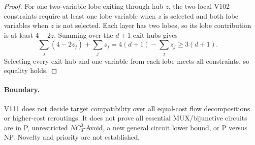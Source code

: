 \documentclass[11pt]{article}
\begin{document}
\begin{proof}
For one two-variable lobe exiting through hub $z$, the two local V102 constraints
require at least one lobe variable when $z$ is selected and both lobe variables
when $z$ is not selected.  Each layer has two lobes, so its lobe contribution is
at least $4-2z$.  Summing over the $d+1$ exit hubs gives
\[
 \sum_j(4-2z_j)+\sum_j z_j
 =4(d+1)-\sum_j z_j\ge3(d+1).
\]
Selecting every exit hub and one variable from each lobe meets all constraints,
so equality holds.
\end{proof}

\paragraph{Boundary.}
V111 does not decide target compatibility over all equal-cost flow decompositions
or higher-cost reroutings.  It does not prove all essential MUX/bijunctive
circuits are in P, unrestricted $NC^0_3$-Avoid, a new general circuit lower bound,
or P versus NP.  Novelty and priority are not established.
\end{document}
